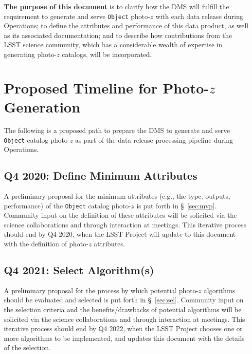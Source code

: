 \documentclass[DM,lsstdraft,toc]{lsstdoc}
\begin{document}
{\bf The purpose of this document} is to clarify how the DMS will fulfill the requirement to generate and serve {\tt Object} photo-$z$ with each data release during Operations; to define the attributes and performance of this data product, as well as its associated documentation; and to describe how contributions from the LSST science community, which has a considerable wealth of expertise in generating photo-$z$ catalogs, will be incorporated.


\clearpage
\section{Proposed Timeline for Photo-$z$ Generation}\label{sec:time}

The following is a proposed path to prepare the DMS to generate and serve {\tt Object} catalog photo-$z$ as part of the data release processing pipeline during Operations.

\subsection{Q4 2020: Define Minimum Attributes}\label{ssec:time_mvp}

A preliminary proposal for the minimum attributes (e.g., the type, outputs, performance) of the {\tt Object} catalog photo-$z$ is put forth in \S~\ref{sec:mvp}.
Community input on the definition of these attributes will be solicited via the science collaborations and through interaction at meetings.
This iterative process should end by Q4 2020, when the LSST Project will update to this document with the definition of photo-$z$ attributes. 

\subsection{Q4 2021: Select Algorithm(s)}\label{ssec:time_sel}

A preliminary proposal for the process by which potential photo-$z$ algorithms should be evaluated and selected is put forth in \S~\ref{sec:sel}.
Community input on the selection criteria and the benefits/drawbacks of potential algorithms will be solicited via the science collaborations and through interaction at meetings.
This iterative process should end by Q4 2022, when the LSST Project chooses one or more algorithms to be implemented, and updates this document with the details of the selection.
\end{document}
